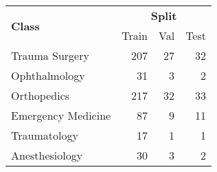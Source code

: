 
\begin{tabular}{l rrr}
    \toprule
    \multirow{2}{*}[-0.5\dimexpr \aboverulesep + \belowrulesep + \cmidrulewidth]{\bfseries Class} &
    \multicolumn{3}{c}{\bfseries Split} \\
    \cmidrule(lr){2-4}
    & Train & Val & Test \\
    \midrule
    Trauma Surgery & 207 & 27 & 32 \\
    Ophthalmology & 31 & 3 & 2 \\
    Orthopedics & 217 & 32 & 33 \\
    Emergency Medicine & 87 & 9 & 11 \\
    Traumatology & 17 & 1 & 1 \\
    Anesthesiology & 30 & 3 & 2 \\
    \bottomrule
\end{tabular}
